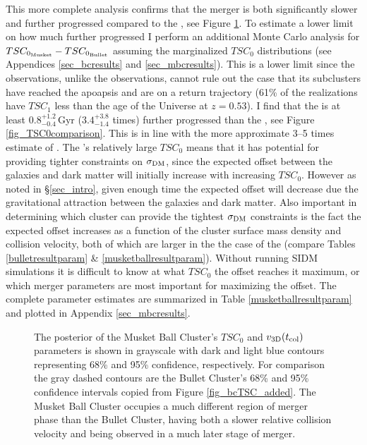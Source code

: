 This more complete analysis confirms that the  merger is both significantly slower and further progressed compared to the , see Figure \ref{fig_mbc_TSC}.
To estimate a lower limit on how much further progressed I perform an additional Monte Carlo analysis  for $TSC_{\rm 0_{Musket}}-TSC_{\rm 0_{Bullet}}$ assuming the marginalized $TSC_0$ distributions (see Appendices \ref{sec_bcresults} and \ref{sec_mbcresults}).
This is a lower limit since the  observations, unlike the  observations, cannot rule out the case that its subclusters have reached the apoapsis and are on a return trajectory (61\% of the realizations have $TSC_1$ less than the age of the Universe at $z=0.53$).
I find that  the  is at least $0.8^{+1.2}_{-0.4}$\,Gyr ($3.4^{+3.8}_{-1.4}$ times) further progressed than the , see Figure \ref{fig_TSC0comparison}.
This is in line with the more approximate 3--5 times estimate of \citet{Dawson:2012dl}.
The 's relatively large $TSC_0$ means that it has potential for providing tighter constraints on $\sigma_{\rm DM}$, since the expected offset between the galaxies and dark matter will initially increase with increasing $TSC_0$.
However as noted in \S\ref{sec_intro}, given enough time the expected offset will decrease due the gravitational attraction between the galaxies and dark matter.
Also important in determining which cluster can provide the tightest $\sigma_{\rm DM}$ constraints is the fact the expected offset increases as a function of the cluster surface mass density and collision velocity, both of which are larger in the the case of the  (compare Tables \ref{bulletresultparam} \& \ref{musketballresultparam}). 
Without running SIDM simulations it is difficult to know at what $TSC_0$ the offset reaches it maximum, or which merger parameters are most important for maximizing the offset.
The complete  parameter estimates are summarized in Table \ref{musketballresultparam} and plotted in Appendix \ref{sec_mbcresults}.

\begin{figure}
\caption{
The posterior of the Musket Ball Cluster's $TSC_0$ and $v_{\rm 3D}(t_{\rm col})$ parameters is shown in grayscale with dark and light blue contours representing 68\% and 95\% confidence, respectively.
For comparison the gray dashed contours are the Bullet Cluster's 68\% and 95\% confidence intervals copied from Figure \ref{fig_bcTSC_added}.
The Musket Ball Cluster occupies a much different region of merger phase than the Bullet Cluster, having both a slower relative collision velocity and being observed in a much later stage of merger.
\label{fig_mbc_TSC}}
\end{figure}

